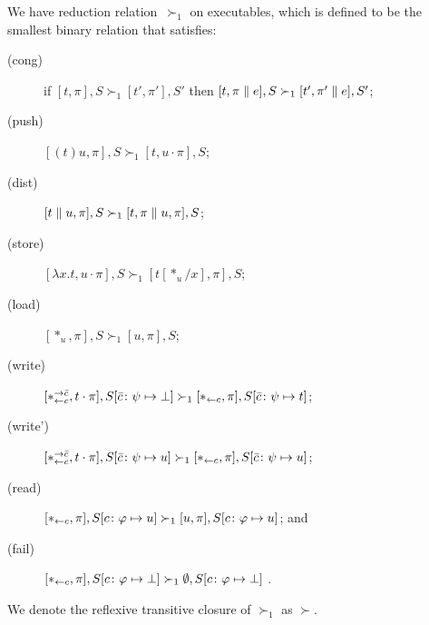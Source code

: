 \newcommand{\red}{\succ_1}
\renewcommand{\reduce}{\succ}
We have reduction relation~$\red$ on executables,
which is defined to be the smallest binary relation
that satisfies:
\begin{description}
 \item[(cong)] if
	    $[t,\pi],         S \red [ t',\pi'],        S'$
	    then
	    $[t,\pi \conc e], S \red [ t',\pi'\conc e], S'$\enspace;
 \item[(push)]
	    $[(t)u,\pi],S       \red [t,u\cdot\pi],S$;
 \item[(dist)]
	    $[t\conc u,\pi],S   \red [t,\pi\conc u,\pi],S$\enspace;
 \item[(store)]
	    $[\lambda x.t,u\cdot\pi],S
	     \red
	     [t[\ast_u/x],      \pi],S$\enspace;
 \item[(load)]
	    $[\ast_u,\pi],S\red[u,\pi],S$\enspace;
 \item[(write)]
	    $
	    [\comod c{\co c}, t\cdot\pi], S[\co
	    c\colon\psi\mapsto\bot]
	    \red
	    [\reader c, \pi],
	    S[\co c\colon\psi\mapsto t]
	    $\enspace;
 \item[(write')]
	    $
	    [\comod c{\co c}, t\cdot\pi], S[\co
	    c\colon\psi\mapsto u]
	    \red
	    [\reader c, \pi],
	    S[\co c\colon\psi\mapsto u]
	    $\enspace;
 \item[(read)]$
	    [\reader c ,\pi],
	    S[c\colon\phi\mapsto u]
	    \red
	    [u,\pi],
	    S[c\colon\phi\mapsto u]
	    $\enspace; and
 \item[(fail)]
	    $
	    [\reader c,\pi],
	    S[c\colon\phi\mapsto \bot]
	    \red
	    \emptyset,S[c\colon\phi\mapsto \bot]
	    $
	    \enspace.
\end{description}
We denote the reflexive transitive closure of $\red$ as $\reduce$.



